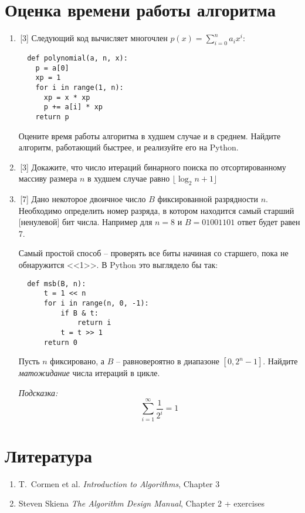 \documentclass[12pt,a4paper]{report}
\begin{document}
\section{Оценка времени работы алгоритма}


\begin{enumerate}

  \item\,[3] Следующий код вычисляет многочлен $p(x) = \sum_{i=0}^{n} a_i x^i$:

  \begin{verbatim}
  def polynomial(a, n, x):
    p = a[0]
    xp = 1
    for i in range(1, n):
      xp = x * xp
      p += a[i] * xp
    return p\end{verbatim}%
  Оцените время работы алгоритма в худшем случае и в среднем. Найдите алгоритм, работающий быстрее, и реализуйте его на Python.


  \item\,[3] Докажите, что число итераций бинарного поиска по отсортированному массиву размера $n$ в худшем случае равно $\lfloor \log_2 n + 1 \rfloor$
  \item\,[7] Дано некоторое двоичное число $B$ фиксированной разрядности $n$. Необходимо определить номер разряда, в котором находится самый старший [ненулевой] бит числа. Например для $n=8$ и $B=01001101$ ответ будет равен 7.

  Самый простой способ -- проверять все биты начиная со старшего, пока не обнаружится <<1>>. В Python это выглядело бы так:
  \begin{verbatim}
  def msb(B, n):
      t = 1 << n
      for i in range(n, 0, -1):
          if B & t:
              return i
          t = t >> 1
      return 0\end{verbatim}%
  Пусть $n$ фиксировано, а $B$ -- равновероятно в диапазоне $[0, 2^n-1]$.
  Найдите {\em матожидание} числа итераций в цикле.

  {\em Подсказка:} $$\sum_{i=1}^{\infty} \frac{1}{2^i} = 1$$

\end{enumerate}



\section*{Литература}

\begin{enumerate}
  \item T.~Cormen et al. {\em Introduction to Algorithms}, Chapter 3
  \item Steven Skiena {\em The Algorithm Design Manual}, Chapter 2 + exercises
\end{enumerate}
\end{document}
